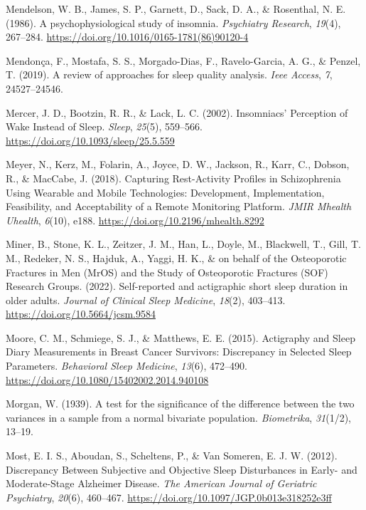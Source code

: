 \documentclass[
]{article}
\newlength{\cslhangindent}
\newenvironment{CSLReferences}[2] %
 {\begin{list}{}{%
  \setlength{\itemindent}{0pt}
  \setlength{\leftmargin}{0pt}
  \setlength{\parsep}{0pt}
  \ifodd #1
   \setlength{\leftmargin}{\cslhangindent}
   \setlength{\itemindent}{-1\cslhangindent}
  \fi
  \setlength{\itemsep}{#2\baselineskip}}}
 {\end{list}}
\begin{document}
\begin{CSLReferences}{1}{0}
Mendelson, W. B., James, S. P., Garnett, D., Sack, D. A., \& Rosenthal, N. E. (1986). A psychophysiological study of insomnia. \emph{Psychiatry Research}, \emph{19}(4), 267--284. \url{https://doi.org/10.1016/0165-1781(86)90120-4}

Mendonça, F., Mostafa, S. S., Morgado-Dias, F., Ravelo-Garcia, A. G., \& Penzel, T. (2019). A review of approaches for sleep quality analysis. \emph{Ieee Access}, \emph{7}, 24527--24546.

Mercer, J. D., Bootzin, R. R., \& Lack, L. C. (2002). Insomniacs' {Perception} of {Wake} {Instead} of {Sleep}. \emph{Sleep}, \emph{25}(5), 559--566. \url{https://doi.org/10.1093/sleep/25.5.559}

Meyer, N., Kerz, M., Folarin, A., Joyce, D. W., Jackson, R., Karr, C., Dobson, R., \& MacCabe, J. (2018). Capturing {Rest}-{Activity} {Profiles} in {Schizophrenia} {Using} {Wearable} and {Mobile} {Technologies}: {Development}, {Implementation}, {Feasibility}, and {Acceptability} of a {Remote} {Monitoring} {Platform}. \emph{JMIR Mhealth Uhealth}, \emph{6}(10), e188. \url{https://doi.org/10.2196/mhealth.8292}

Miner, B., Stone, K. L., Zeitzer, J. M., Han, L., Doyle, M., Blackwell, T., Gill, T. M., Redeker, N. S., Hajduk, A., Yaggi, H. K., \& on behalf of the Osteoporotic Fractures in Men (MrOS) and the Study of Osteoporotic Fractures (SOF) Research Groups. (2022). Self-reported and actigraphic short sleep duration in older adults. \emph{Journal of Clinical Sleep Medicine}, \emph{18}(2), 403--413. \url{https://doi.org/10.5664/jcsm.9584}

Moore, C. M., Schmiege, S. J., \& Matthews, E. E. (2015). Actigraphy and {Sleep} {Diary} {Measurements} in {Breast} {Cancer} {Survivors}: {Discrepancy} in {Selected} {Sleep} {Parameters}. \emph{Behavioral Sleep Medicine}, \emph{13}(6), 472--490. \url{https://doi.org/10.1080/15402002.2014.940108}

Morgan, W. (1939). A test for the significance of the difference between the two variances in a sample from a normal bivariate population. \emph{Biometrika}, \emph{31}(1/2), 13--19.

Most, E. I. S., Aboudan, S., Scheltens, P., \& Van Someren, E. J. W. (2012). Discrepancy {Between} {Subjective} and {Objective} {Sleep} {Disturbances} in {Early}- and {Moderate}-{Stage} {Alzheimer} {Disease}. \emph{The American Journal of Geriatric Psychiatry}, \emph{20}(6), 460--467. \url{https://doi.org/10.1097/JGP.0b013e318252e3ff}


\end{CSLReferences}
\end{document}
